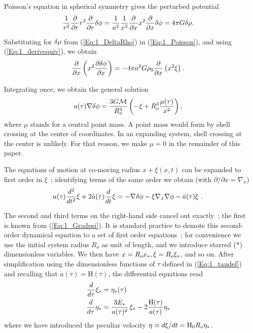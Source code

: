 Poisson's equation in spherical symmetry gives the perturbed potential 
\begin{equation} 
\label{Eq:1_Poisson} 
\frac{1}{r^2}\frac{\partial}{\partial r} r^2\frac{\partial}{\partial r} \delta\phi =\frac{1}{a^2}\frac{1}{x^2}\frac{\partial}{\partial x} x^2\frac{\partial}{\partial x} \delta\phi  = 4\pi G\delta\rho .
\end{equation}

Substituting for $\delta\rho$ from (\ref{Eq:1_DeltaRho}) in (\ref{Eq:1_Poisson}), and using (\ref{Eq:1_derivequiv}), we obtain
\begin{equation}
\frac{\partial}{\partial x} \left( x^2 \frac{\partial \delta\phi}{\partial x} \right) = - 4\pi a^2 G \rho_0 \frac{\partial}{\partial x} \left( x^2 \xi \right).
\end{equation}

Integrating once, we obtain the general solution
\begin{equation}
\label{Eq:1_Gradpsi} 
a(\tau)\nabla \delta\phi = \frac{3G{\cal M}}{R_o^3} \left( - \xi + R_o^3\frac{\mu(\tau)}{x^2} \right),
\end{equation}
where $\mu$ stands for a central point mass. A point mass would form by shell crossing at the center of coordinates. In an expanding system, shell crossing at the center is unlikely. For that reason, we make $ \mu = 0$ in the remainder of this paper.

The equations of motion at co-moving radius $x +\xi(x,t)$ can be expanded to first order in $\xi$~; identifying terms of the same order we obtain (with $\partial/\partial x = \nabla_x$)
\begin{equation} 
a(\tau) \frac{d^2}{d t^2} \xi + 2 \dot{a}(\tau) \frac{d}{dt}\xi = - \nabla\delta\phi - \xi \nabla_x \nabla\phi - \ddot{a}(\tau)\xi \ . 
\end{equation} 

The second and third terms on the right-hand side cancel out exactly~; the first is known from (\ref{Eq:1_Gradpsi}). It is standard practice to demote this second-order dynamical equation to a set of first order equations~; for convenience we use the initial system radius $R_o$ as unit of length,  and we introduce starred ($\ast$) dimensionless variables. We then have $x = R_o x_\ast, \xi = R_o\xi_\ast$, and so on.  After simplification using the dimensionless functions of $\tau$  defined in (\ref{Eq:1_taudef}) and recalling that $\dot{a}(\tau) = \textrm{H}(\tau)$, the differential equations read
\begin{subequations}
 \label{Eq:1_system}
    \begin{align}
    	\label{Eq:1_systema}
		\frac{d}{d\tau} \xi_\ast &=  \eta_\ast(\tau)  \\ 
		\label{Eq:1_systemb}
		\frac{d}{d\tau} \eta_\ast &= \frac{3 E_\ast}{a(\tau)^2}\,\xi_\ast - 2 		\frac{\textrm{H}(\tau)}{a(\tau)} \eta_\ast   
	\end{align}
\end{subequations}
where we have introduced the peculiar velocity $\eta \equiv d\xi/dt = {\textrm{H}}_0R_o \eta_\ast$.  



